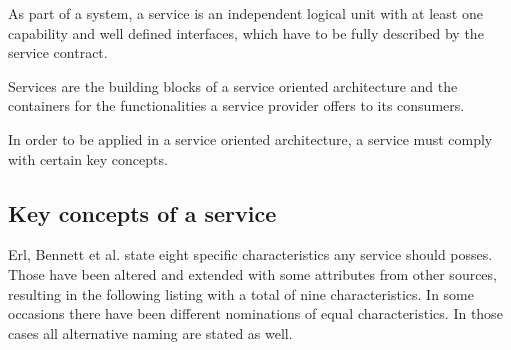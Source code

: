 \begin{myquote}
	As part of a system, a service is an independent logical unit with at least one capability and well defined interfaces, which have to be fully described by the service contract.

	Services are the building blocks of a service oriented architecture and the containers for the functionalities a service provider offers to its consumers.

	In order to be applied in a service oriented architecture, a service must comply with certain key concepts.
\end{myquote}



\subsection{Key concepts of a service}
\label{sec:service-concepts}
Erl, Bennett et al. \cite[p.27]{erl2011} state eight specific characteristics any service should posses. Those have been altered and extended with some attributes from other sources, resulting in the following listing with a total of nine characteristics. In some occasions there have been different nominations of equal characteristics. In those cases all alternative naming are stated as well.


